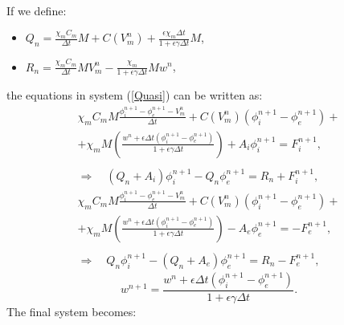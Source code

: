 \documentclass[a4paper,11pt]{article}
\begin{document}
\vspace{2mm} \\
If we define:
\begin{itemize}
\item $Q_n = \frac{\chi_m C_m}{\Delta t}M + C(V_m^n) + \frac{\epsilon\chi_m \Delta t}{1 + \epsilon \gamma \Delta t} M$,
\item $R_n = \frac{\chi_mC_m}{\Delta t}MV_m^n - \frac{\chi_m}{1+\epsilon\gamma\Delta t}M w^n$,
\end{itemize}
\vspace{4mm}
the equations in system (\ref{Quasi}) can be written as:
\begin{equation}
\begin{gathered}
\chi_m C_m M \frac{	\phi_i^{n+1}-\phi_e^{n+1}-V_m^{n}}{\Delta t} +  C(V_m^n) (\phi_i^{n+1}-\phi_e^{n+1}) + \\
 +\chi_m M \left(\frac{w^n + \epsilon \Delta t (\phi_i^{n+1}-\phi_e^{n+1})}{1+\epsilon \gamma \Delta t}   \right)
+ A_i \phi_i ^{n+1} = F_i^{n+1}, \\ \\
\Rightarrow \quad (Q_n + A_i) \phi_i^{n+1} - Q_n \phi_e^{n+1} =R_n +  F_i^{n+1},
\end{gathered}
\end{equation}
\vspace{3mm}
\begin{equation}
\begin{gathered}
\chi_m C_m M \frac{	\phi_i^{n+1}-\phi_e^{n+1}-V_m^{n}}{\Delta t} + C(V_m^n) (\phi_i^{n+1}-\phi_e^{n+1}) +\\ 
+ \chi_m M \left(\frac{w^n + \epsilon \Delta t (\phi_i^{n+1}-\phi_e^{n+1})}{1+\epsilon \gamma \Delta t}   \right)
- A_e \phi_e ^{n+1} = -F_e^{n+1}, \\ \\
\Rightarrow \quad Q_n \phi_i^{n+1} - (Q_n+A_e) \phi_e^{n+1} =R_n - F_e^{n+1},
\end{gathered}
\end{equation}
\vspace{3mm}
\begin{equation}
w^{n+1} = \frac{w^n + \epsilon \Delta t (\phi_i^{n+1}-\phi_e^{n+1})}{1+\epsilon \gamma \Delta t}.
\end{equation}
The final system becomes: \\
\end{document}
